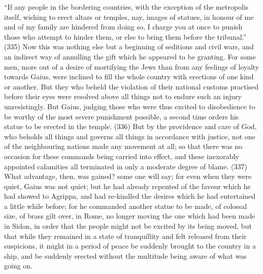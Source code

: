 ``If any people in the bordering countries, with the exception of the metropolis itself, wishing to erect
altars or temples, nay, images of statues, in honour of me and of my family are hindered from
doing so, I charge you at once to punish those who attempt to hinder them, or else to bring them
before the tribunal.'' (335) Now this was nothing else but a beginning of seditions and civil wars,
and an indirect way of annulling the gift which he appeared to be granting. For some men, more out
of a desire of mortifying the Jews than from any feelings of loyalty towards Gaius, were inclined to
fill the whole country with erections of one kind or another. But they who beheld the violation of their
national customs practised before their eyes were resolved above all things not to endure such an
injury unresistingly. But Gaius, judging those who were thus excited to disobedience to be worthy of
the most severe punishment possible, a second time orders his statue to be erected in the temple.
(336) But by the providence and care of God, who beholds all things and governs all things in
accordance with justice, not one of the neighbouring nations made any movement at all; so that
there was no occasion for these commands being carried into effect, and these inexorably
appointed calamities all terminated in only a moderate degree of blame. (337) What advantage,
then, was gained? some one will say; for even when they were quiet, Gaius was not quiet; but he
had already repented of the favour which he had showed to Agrippa, and had re-kindled the
desires which he had entertained a little while before; for he commanded another statue to be
made, of colossal size, of brass gilt over, in Rome, no longer moving the one which had been
made in Sidon, in order that the people might not be excited by its being moved, but that while they
remained in a state of tranquillity and felt released from their suspicions, it might in a period of
peace be suddenly brought to the country in a ship, and be suddenly erected without the multitude
being aware of what was going on.

